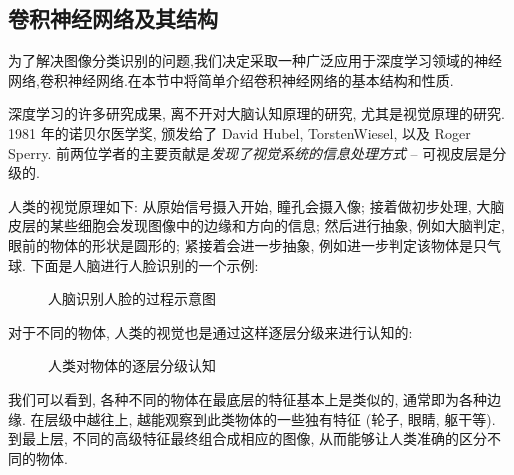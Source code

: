 \documentclass[lang=cn, 11pt,   a4paper]{elegantpaper}
\begin{document}
\subsection{卷积神经网络及其结构}
为了解决图像分类识别的问题,我们决定采取一种广泛应用于深度学习领域的神经网络,卷积神经网络.在本节中将简单介绍卷积神经网络的基本结构和性质.

深度学习的许多研究成果, 离不开对大脑认知原理的研究, 尤其是视觉原理的研究. 1981 年的诺贝尔医学奖, 颁发给了 David Hubel, TorstenWiesel, 以及 Roger Sperry. 前两位学者的主要贡献是\textit{发现了视觉系统的信息处理方式} -- 可视皮层是分级的.

人类的视觉原理如下:  从原始信号摄入开始, 瞳孔会摄入像; 接着做初步处理, 大脑皮层的某些细胞会发现图像中的边缘和方向的信息; 然后进行抽象, 例如大脑判定, 眼前的物体的形状是圆形的; 紧接着会进一步抽象, 例如进一步判定该物体是只气球. 下面是人脑进行人脸识别的一个示例:  
\begin{figure}[H]
\caption{人脑识别人脸的过程示意图}
\end{figure}

对于不同的物体, 人类的视觉也是通过这样逐层分级来进行认知的: 
\begin{figure}[H]
\caption{人类对物体的逐层分级认知}
\end{figure}

我们可以看到, 各种不同的物体在最底层的特征基本上是类似的, 通常即为各种边缘. 在层级中越往上, 越能观察到此类物体的一些独有特征 (轮子, 眼睛, 躯干等). 到最上层, 不同的高级特征最终组合成相应的图像, 从而能够让人类准确的区分不同的物体. 
\end{document}
